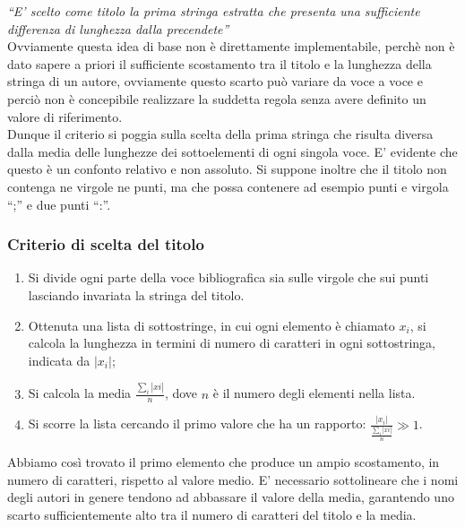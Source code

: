 \textit{``E' scelto come titolo la prima stringa estratta che presenta una sufficiente differenza di lunghezza dalla precendete''}\\

Ovviamente questa idea di base non è direttamente implementabile, perchè non è dato sapere a priori il sufficiente scostamento tra il titolo e la lunghezza della stringa di un autore, ovviamente questo scarto può variare da voce a voce e perciò non è concepibile realizzare la suddetta regola senza avere definito un valore di riferimento.\\
Dunque il criterio si poggia sulla scelta della prima stringa che risulta diversa dalla media delle lunghezze dei sottoelementi di ogni singola voce. E' evidente che questo è un confonto relativo e non assoluto. Si suppone inoltre che il titolo non contenga ne virgole ne punti, ma che possa contenere ad esempio punti e virgola ``;'' e due punti ``:''.
\\
\subsubsection{Criterio di scelta del titolo}
\begin{enumerate}
 \item Si divide ogni parte della voce bibliografica sia sulle virgole che sui punti lasciando invariata la stringa del titolo.
 \item Ottenuta una lista di sottostringe, in cui ogni elemento è chiamato $x_i$, si calcola la lunghezza in termini di numero di caratteri in ogni sottostringa, indicata da $|x_i|$;
 \item Si calcola la media $\frac{\sum_i |xi|}{n}$, dove $n$ è il numero degli elementi nella lista.
 \item Si scorre la lista cercando il primo valore che ha un rapporto: $ \frac{|x_i|}{\frac{\sum_i |xi|}{n} } \gg 1 $.
\end{enumerate}

Abbiamo così trovato il primo elemento che produce un ampio scostamento, in numero di caratteri, rispetto al valore medio. E' necessario sottolineare che i nomi degli autori in genere tendono ad abbassare il valore della media, garantendo uno scarto sufficientemente alto tra il numero di caratteri del titolo e la media. 
\newpage

